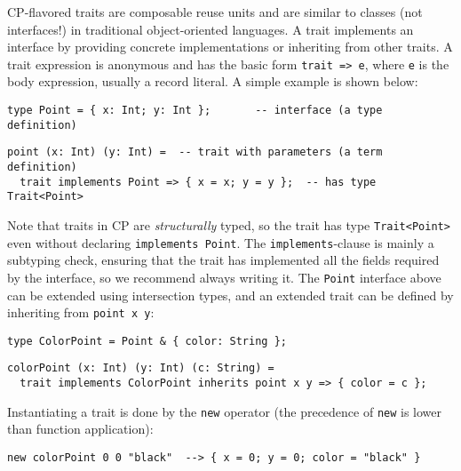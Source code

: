 CP-flavored traits are composable reuse units and are similar to classes (not
interfaces!) in traditional object-oriented languages. A trait implements an
interface by providing concrete implementations or inheriting from other traits.
A trait expression is anonymous and has the basic form \lstinline{trait => e},
where \lstinline{e} is the body expression, usually a record literal. A simple
example is shown below:
\begin{lstlisting}
type Point = { x: Int; y: Int };       -- interface (a type definition)
\end{lstlisting}
\vspace{-1ex}
\begin{lstlisting}
point (x: Int) (y: Int) =  -- trait with parameters (a term definition)
  trait implements Point => { x = x; y = y };  -- has type Trait<Point>
\end{lstlisting}
Note that traits in CP are \emph{structurally} typed, so the trait has type
\lstinline{Trait<Point>} even without declaring \lstinline{implements Point}.
The \lstinline{implements}-clause is mainly a subtyping check, ensuring that the
trait has implemented all the fields required by the interface, so we recommend
always writing it. The \lstinline{Point} interface above can be extended using
intersection types, and an extended trait can be defined by inheriting from
\lstinline{point x y}:
\begin{lstlisting}
type ColorPoint = Point & { color: String };
\end{lstlisting}
\vspace{-1ex}
\begin{lstlisting}
colorPoint (x: Int) (y: Int) (c: String) =
  trait implements ColorPoint inherits point x y => { color = c };
\end{lstlisting}
Instantiating a trait is done by the \lstinline{new} operator (the precedence of
\lstinline{new} is lower than function application):
\begin{lstlisting}
new colorPoint 0 0 "black"  --> { x = 0; y = 0; color = "black" }
\end{lstlisting}


